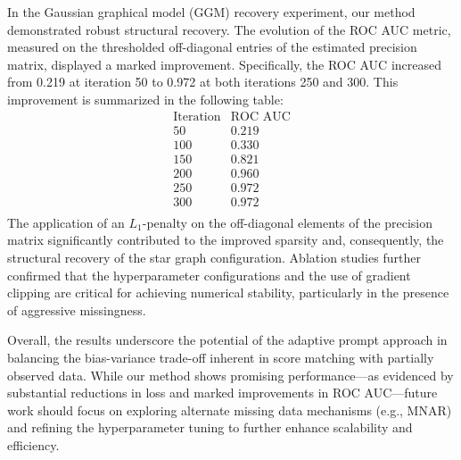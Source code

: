 \documentclass{article}
\begin{document}
In the Gaussian graphical model (GGM) recovery experiment, our method demonstrated robust structural recovery. The evolution of the ROC AUC metric, measured on the thresholded off-diagonal entries of the estimated precision matrix, displayed a marked improvement. Specifically, the ROC AUC increased from 0.219 at iteration 50 to 0.972 at both iterations 250 and 300. This improvement is summarized in the following table:
\[
\begin{array}{c|c}
\text{Iteration} & \text{ROC AUC} \\ \hline
50 & 0.219 \\[6pt]
100 & 0.330 \\[6pt]
150 & 0.821 \\[6pt]
200 & 0.960 \\[6pt]
250 & 0.972 \\[6pt]
300 & 0.972 \\
\end{array}
\]
The application of an \(L_1\)-penalty on the off-diagonal elements of the precision matrix significantly contributed to the improved sparsity and, consequently, the structural recovery of the star graph configuration. Ablation studies further confirmed that the hyperparameter configurations and the use of gradient clipping are critical for achieving numerical stability, particularly in the presence of aggressive missingness.

Overall, the results underscore the potential of the adaptive prompt approach in balancing the bias-variance trade-off inherent in score matching with partially observed data. While our method shows promising performance—as evidenced by substantial reductions in loss and marked improvements in ROC AUC—future work should focus on exploring alternate missing data mechanisms (e.g., MNAR) and refining the hyperparameter tuning to further enhance scalability and efficiency.
\end{document}
